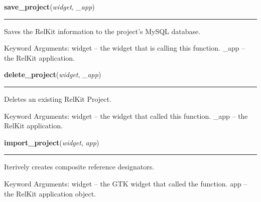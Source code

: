     \vspace{0.5ex}

\hspace{.8\funcindent}\begin{boxedminipage}{\funcwidth}

    \raggedright \textbf{save\_project}(\textit{widget}, \textit{\_app})

    \vspace{-1.5ex}

    \rule{\textwidth}{0.5\fboxrule}
\setlength{\parskip}{2ex}
    Saves the RelKit information to the project's MySQL database.

    Keyword Arguments: widget -- the widget that is calling this function. 
    \_app   -- the RelKit application.

\setlength{\parskip}{1ex}
    \end{boxedminipage}

    \label{reliafree:utilities:delete_project}

    \vspace{0.5ex}

\hspace{.8\funcindent}\begin{boxedminipage}{\funcwidth}

    \raggedright \textbf{delete\_project}(\textit{widget}, \textit{\_app})

    \vspace{-1.5ex}

    \rule{\textwidth}{0.5\fboxrule}
\setlength{\parskip}{2ex}
    Deletes an existing RelKit Project.

    Keyword Arguments: widget -- the widget that called this function. 
    \_app   -- the RelKit application.

\setlength{\parskip}{1ex}
    \end{boxedminipage}

    \label{reliafree:utilities:import_project}

    \vspace{0.5ex}

\hspace{.8\funcindent}\begin{boxedminipage}{\funcwidth}

    \raggedright \textbf{import\_project}(\textit{widget}, \textit{app})

    \vspace{-1.5ex}

    \rule{\textwidth}{0.5\fboxrule}
\setlength{\parskip}{2ex}
    Iterively creates composite reference designators.

    Keyword Arguments: widget -- the GTK widget that called the function. 
    app    -- the RelKit application object.

\setlength{\parskip}{1ex}
    \end{boxedminipage}

